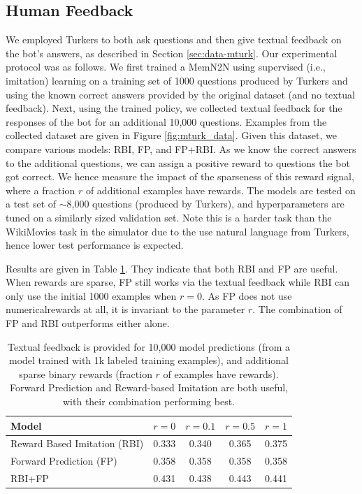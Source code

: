 \subsection{Human Feedback} \label{sec:mturkexp}
We employed Turkers to both ask questions and then give textual feedback
on the bot's answers, as described in Section \ref{sec:data-mturk}.
Our experimental protocol was as follows.
We first trained a MemN2N using supervised (i.e., imitation) learning on a training 
set of 1000 questions produced by Turkers and using the known correct answers 
provided by the original dataset (and no textual feedback).
Next, using the trained policy, we collected textual feedback for the responses
of the bot for an additional 10,000 questions.
Examples from the collected dataset are given in Figure \ref{fig:mturk_data}.
Given this dataset, we compare various models: RBI, FP, and FP+RBI.
As we know the correct answers to the additional questions, we can  assign a positive reward
to questions the bot got correct. We hence measure the impact of the sparseness of this
reward signal, where a fraction $r$ of additional examples have rewards.
The models are tested on a test set of $\sim$8,000 questions (produced by Turkers),
and hyperparameters are tuned on a similarly sized validation set.
Note this is a harder task than the WikiMovies task in the simulator due to 
the use natural language from Turkers, hence lower test performance is expected.

Results are given in Table \ref{table:mturk-res}.
They indicate that both RBI and FP are useful.
When rewards are sparse, FP still works via the textual feedback 
while RBI can only use the initial 1000 examples when $r=0$.
As FP does not use numericalrewards at all, it is invariant to the parameter $r$.
The combination of FP and RBI outperforms either alone.


\begin{table}[!tbh]
\begin{center}
\begin{tabular}{lcccc}\toprule
Model                         & $r=0$   &  $r=0.1$  &  $r=0.5$  & $r=1$ \\\midrule
Reward Based Imitation (RBI)  & 0.333    &  0.340   &  0.365   & 0.375 \\
Forward Prediction (FP)       & 0.358    &  0.358   &  0.358   & 0.358 \\
RBI+FP                        & 0.431    &  0.438   &  0.443   & 0.441 \\\bottomrule
\end{tabular}
\end{center}
\caption[Incorporating feedback from humans via Mechanical Turk.]{
Textual feedback is provided for 10,000 model predictions (from a model trained with 1k labeled
 training examples), and additional sparse
binary rewards (fraction $r$ of examples have rewards).
Forward Prediction
and Reward-based Imitation are both useful, with their combination performing best.
\label{table:mturk-res}
}
\end{table}



